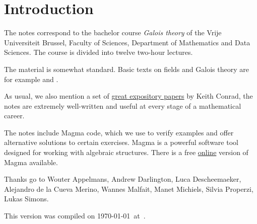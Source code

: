 \section*{Introduction}

The notes correspond to the bachelor 
course \emph{Galois theory} of the 
Vrije Universiteit Brussel, 
Faculty of Sciences, 
Department of Mathematics and Data Sciences. The course
is divided into twelve two-hour lectures. 

The material is somewhat standard. Basic texts on fields and Galois theory 
are for example \cite{MR1645586} and 
\cite{MR3379917}. 

As usual, we also mention a set of 
\href{https://kconrad.math.uconn.edu/blurbs/}{great expository papers} by 
Keith Conrad, the notes are extremely well-written and useful  
at every stage of a mathematical career. 


The notes include Magma code, which we use to verify examples and offer alternative solutions to certain exercises. Magma is a powerful software tool designed for working with algebraic structures. There is a free \href{https://magma.maths.usyd.edu.au/calc/}{online} version of Magma available.

 
Thanks go to Wouter Appelmans, Andrew Darlington, Luca Descheemaeker, 
Alejandro de la Cueva Merino, 
Wannes Malfait, Manet Michiels, Silvia Properzi, 
Lukas Simons. 


This version 
was compiled on \today~at~\currenttime.
